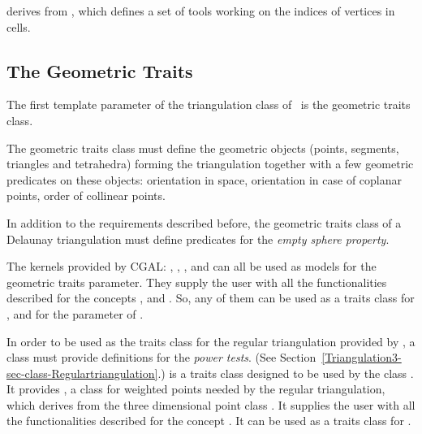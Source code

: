  derives from
, which defines a set of tools
working on the indices of vertices in cells. 

\subsection{The Geometric Traits}
\label{Triangulation3-sec-Traits}

The first template parameter of the triangulation class
of \cgal\ is the geometric traits class.

The geometric traits class must define the geometric
objects (points, segments, triangles and tetrahedra) forming the
triangulation together with a few geometric predicates on these objects:
orientation in space, orientation in case of coplanar points, order of
collinear points.

In addition to the requirements described before, the geometric traits
class of a Delaunay triangulation must define predicates for the
\textit{empty sphere property}.

The kernels provided by CGAL: , ,
,  and
 can all be used as models for the geometric traits
parameter.
They supply the user with all the functionalities described for the concepts
,
 and
.
So, any of them can be used as a traits class for
,
and for the parameter  of .

In order to be used as the traits class for the regular triangulation provided
by \cgal, a class must provide definitions for the \textit{power tests}.
(See Section~\ref{Triangulation3-sec-class-Regulartriangulation}.)
 is a traits class 
 designed to be used by the class
. It provides
, a class for weighted points
needed by the regular triangulation, which derives from the three dimensional
point class .
It supplies the user with all the functionalities 
described for the concept . 
It can be used as a traits class for
.

